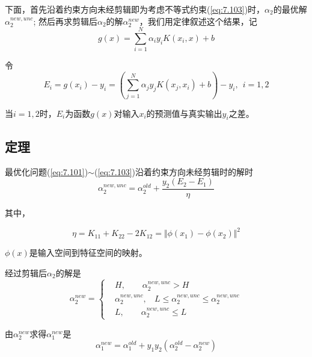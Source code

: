 下面，首先沿着约束方向未经剪辑即为考虑不等式约束(\ref{eq:7.103})时，$\alpha_2$的最优解$\alpha^{new,unc}_2$;
然后再求剪辑后$\alpha_2$的解$\alpha^{new}_2$，我们用定律叙述这个结果，记
\begin{equation}
    g(x)=\sum\limits_{i=1}^{N}\alpha_iy_iK(x_i,x)+b
\end{equation}

令
\begin{equation}
    E_i=g(x_i)-y_i=(\sum\limits_{j=1}^{N}\alpha_jy_jK(x_j,x_i)+b)-y_i,\ \ i=1,2
\end{equation}

当$i=1,2$时，$E_i$为函数$g(x)$对输入$x_i$的预测值与真实输出$y_i$之差。

\subsection*{定理}
\begin{theorem}
    最优化问题(\ref{eq:7.101})$\sim$(\ref{eq:7.103})沿着约束方向未经剪辑时的解时
    \begin{equation}
       \alpha^{new,unc}_2=\alpha^{old}_2+\frac{y_2(E_2-E_1)}{\eta}
    \end{equation}

    其中，

    \begin{equation}
        \eta=K_{11}+K_{22}-2K_{12}=\Vert \phi(x_1)-\phi(x_2)\Vert^2
    \end{equation}

    $\phi(x)$是输入空间到特征空间的映射。

    经过剪辑后$\alpha_2$的解是
    \begin{equation}
        \alpha^{new}_2=
        \begin{cases}
            &H, \ \ \ \ \ \ \ \ \ \alpha^{new,unc}_2>H\\
            &\alpha^{new,unc}_2,\ \ \ \  L\leqslant \alpha^{new,unc}_2\leqslant \alpha^{new,unc}_2\\
            & L,\ \ \ \ \ \ \ \ \ \alpha^{new,unc}_2\leqslant L
        \end{cases}
    \end{equation}

    由$\alpha^{new}_2$求得$\alpha^{new}_1$是
    \begin{equation}
        \alpha^{new}_1=\alpha^{old}_1+y_1y_2(\alpha^{old}_2-\alpha^{new}_2)
    \end{equation}
\end{theorem}

